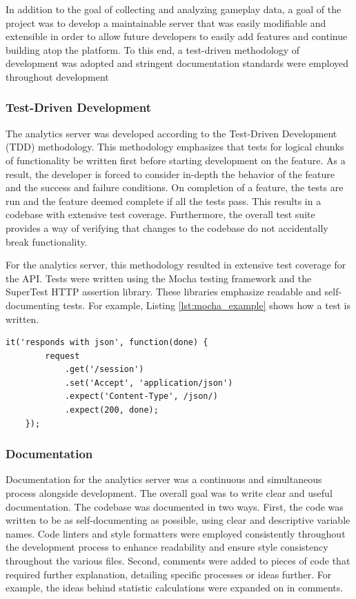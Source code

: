 In addition to the goal of collecting and analyzing gameplay data, a goal of the project was to develop a maintainable server that was easily modifiable and extensible in order to allow future developers to easily add features and continue building atop the platform. To this end, a test-driven methodology of development was adopted and stringent documentation standards were employed throughout development


\subsubsection{Test-Driven Development}

The analytics server was developed according to the Test-Driven Development (TDD) methodology. This methodology emphasizes that tests for logical chunks of functionality be written first before starting development on the feature. As a result, the developer is forced to consider in-depth the behavior of the feature and the success and failure conditions. On completion of a feature, the tests are run and the feature deemed complete if all the tests pass. This results in a codebase with extensive test coverage. Furthermore, the overall test suite provides a way of verifying that changes to the codebase do not accidentally break functionality. 

For the analytics server, this methodology resulted in extensive test coverage for the API. Tests were written using the Mocha testing framework and the SuperTest HTTP assertion library. These libraries emphasize readable and self-documenting tests. For example, Listing \ref{lst:mocha_example} shows how a test is written.

\medskip
\begin{lstlisting}[caption=Example Mocha test{,} testing that the Session API responds in JSON, label={lst:mocha_example}]
	it('responds with json', function(done) {
		request
			.get('/session')
			.set('Accept', 'application/json')
			.expect('Content-Type', /json/)
			.expect(200, done);
	});
\end{lstlisting}

\subsubsection{Documentation}

Documentation for the analytics server was a continuous and simultaneous process alongside development. The overall goal was to write clear and useful documentation. The codebase was documented in two ways. First, the code was written to be as self-documenting as possible, using clear and descriptive variable names. Code linters and style formatters were employed consistently throughout the development process to enhance readability and ensure style consistency throughout the various files. Second, comments were added to pieces of code that required further explanation, detailing specific processes or ideas further. For example, the ideas behind statistic calculations were expanded on in comments.

